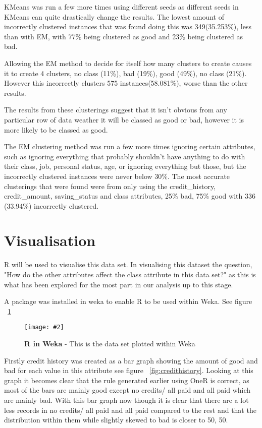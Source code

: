 \documentclass[12pt, a4paper]{article}
\newcommand{\figuremacro}[5]{
	\begin{figure}[#1]
		\centering
		\texttt{[image: \#2]}
		\caption[#3]{\textbf{#3}#4}
		\label{fig:#2}
	\end{figure}
}
\begin{document}
	KMeans was run a few more times using different seeds as different seeds in KMeans can quite drastically change the results. The lowest amount of incorrectly clustered instances that was found doing this was 349(35.253\%), less than with EM, with 77\% being clustered as good and 23\% being clustered as bad.
	
	Allowing the EM method to decide for itself how many clusters to create causes it to create 4 clusters, no class (11\%), bad (19\%), good (49\%), no class (21\%). However this incorrectly clusters 575 instances(58.081\%), worse than the other results.
	
	The results from these clusterings suggest that it isn't obvious from any particular row of data weather it will be classed as good or bad, however it is more likely to be classed as good.
	
	The EM clustering method was run a few more times ignoring certain attributes, such as ignoring everything that probably shouldn't have anything to do with their class, job, personal status, age, or ignoring everything but those, but the incorrectly clustered instances were never below 30\%. The most accurate clusterings that were found were from only using the credit\_history, credit\_amount, saving\_status and class attributes, 25\% bad, 75\% good with 336 (33.94\%) incorrectly clustered.
	
	
	\section{Visualisation}
	
	R will be used to visualise this data set. In visualising this dataset the question, "How do the other attributes affect the class attribute in this data set?" as this is what has been explored for the most part in our analysis up to this stage.
	
	A package was installed in weka to enable R to be used within Weka. See figure ~\ref{fig:rweka}
	
	\figuremacro{h}{rweka}{R in Weka}{ - This is the data set plotted within Weka}{1.0}
	
	Firstly credit history was created as a bar graph showing the amount of good and bad for each value in this attribute see figure ~\ref{fig:credithistory}. Looking at this 
	graph it becomes clear that the rule generated earlier using OneR is correct, as most of the bars are mainly good except no credits/ all paid and all paid which are mainly bad. With this bar graph now though it is clear that there are a lot less records in no credits/ all paid and all paid compared to the rest and that the distribution within them while slightly skewed to bad is closer to 50, 50.
	
\end{document}
